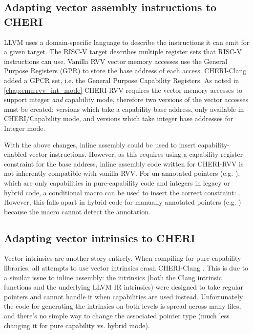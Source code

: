 \subsection{Adapting vector assembly instructions to CHERI}
LLVM uses a domain-specific language to describe the instructions it can emit for a given target.
The RISC-V target describes multiple register sets that RISC-V instructions can use.
Vanilla RVV vector memory accesses use the General Purpose Registers (GPR) to store the base address of each access.
CHERI-Clang added a GPCR set, i.e. the General Purpose Capability Registers.
As noted in \cref{chap:emu:rvv_int_mode} CHERI-RVV requires the vector memory accesses to support integer \emph{and} capability mode, therefore two versions of the vector accesses must be created: versions which take a capability base address, only available in CHERI/Capability mode, and versions which take integer base addresses for Integer mode.

With the above changes, inline assembly could be used to insert capability-enabled vector instructions.
However, as this requires using a capability register constraint for the base address, inline assembly code written for CHERI-RVV is not inherently compatible with vanilla RVV.
For un-annotated pointers (e.g. ), which are only capabilities in pure-capability code and integers in legacy or hybrid code, a conditional macro can be used to insert the correct constraint: .
However, this falls apart in hybrid code for manually annotated pointers (e.g. ) because the macro cannot detect the annotation.


\subsection{Adapting vector intrinsics to CHERI}
Vector intrinsics are another story entirely.
When compiling for pure-capability libraries, all attempts to use vector intrinsics crash CHERI-Clang .
This is due to a similar issue to inline assembly: the intrinsics (both the Clang intrinsic functions and the underlying LLVM IR intrinsics) were designed to take regular pointers and cannot handle it when capabilities are used instead.
Unfortunately the code for generating the intrinsics on both levels is spread across many files, and there's no simple way to change the associated pointer type (much less changing it for pure capability vs. hybrid mode).

